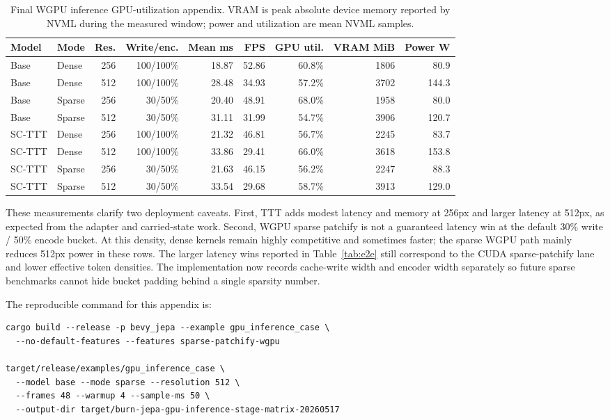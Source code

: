 \documentclass[10pt]{article}
\begin{document}
\begin{table}[t]
\centering
\scriptsize
\caption{Final WGPU inference GPU-utilization appendix.  VRAM is peak absolute
device memory reported by NVML during the measured window; power and
utilization are mean NVML samples.}
\label{tab:gpu-util}
\begin{tabular}{llrrrrrrr}
\toprule
Model & Mode & Res. & Write/enc. & Mean ms & FPS & GPU util. & VRAM MiB & Power W \\
\midrule
Base & Dense & 256 & 100/100\% & 18.87 & 52.86 & 60.8\% & 1806 & 80.9 \\
Base & Dense & 512 & 100/100\% & 28.48 & 34.93 & 57.2\% & 3702 & 144.3 \\
Base & Sparse & 256 & 30/50\% & 20.40 & 48.91 & 68.0\% & 1958 & 80.0 \\
Base & Sparse & 512 & 30/50\% & 31.11 & 31.99 & 54.7\% & 3906 & 120.7 \\
SC-TTT & Dense & 256 & 100/100\% & 21.32 & 46.81 & 56.7\% & 2245 & 83.7 \\
SC-TTT & Dense & 512 & 100/100\% & 33.86 & 29.41 & 66.0\% & 3618 & 153.8 \\
SC-TTT & Sparse & 256 & 30/50\% & 21.63 & 46.15 & 56.2\% & 2247 & 88.3 \\
SC-TTT & Sparse & 512 & 30/50\% & 33.54 & 29.68 & 58.7\% & 3913 & 129.0 \\
\bottomrule
\end{tabular}
\end{table}

These measurements clarify two deployment caveats.  First, TTT adds modest
latency and memory at 256px and larger latency at 512px, as expected from the
adapter and carried-state work.  Second, WGPU sparse patchify is not a
guaranteed latency win at the default 30\% write / 50\% encode bucket.  At
this density, dense kernels remain highly competitive and sometimes faster;
the sparse WGPU path mainly reduces 512px power in these rows.  The larger
latency wins reported in Table~\ref{tab:e2e} still correspond to the CUDA
sparse-patchify lane and lower effective token densities.  The implementation
now records cache-write width and encoder width separately so future sparse
benchmarks cannot hide bucket padding behind a single sparsity number.

The reproducible command for this appendix is:
\begin{verbatim}
cargo build --release -p bevy_jepa --example gpu_inference_case \
  --no-default-features --features sparse-patchify-wgpu

target/release/examples/gpu_inference_case \
  --model base --mode sparse --resolution 512 \
  --frames 48 --warmup 4 --sample-ms 50 \
  --output-dir target/burn-jepa-gpu-inference-stage-matrix-20260517
\end{verbatim}
\end{document}
